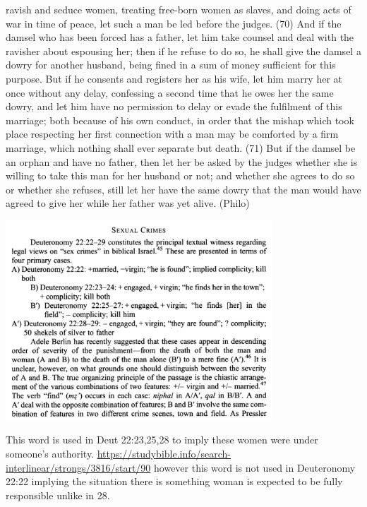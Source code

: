 \documentclass[11pt]{article}
\begin{document}
{ravish and seduce women, treating free-born women as slaves, and doing acts of war in time of peace, let such a man be led before the judges. (70) And if the damsel who has been forced has a father, let him take counsel and deal with the ravisher about espousing her; then if he refuse to do so, he shall give the damsel a dowry for another husband, being fined in a sum of money sufficient for this purpose. But if he consents and registers her as his wife, let him marry her at once without any delay, confessing a second time that he owes her the same dowry, and let him have no permission to delay or evade the fulfilment of this marriage; both because of his own conduct, in order that the mishap which took place respecting her first connection with a man may be comforted by a firm marriage, which nothing shall ever separate but death. (71) But if the damsel be an orphan and have no father, then let her be asked by the judges whether she is willing to take this man for her husband or not; and whether she agrees to do so or whether she refuses, still let her have the same dowry that the man would have agreed to give her while her father was yet alive.
(Philo)

\includegraphics[width=10cm]{deuteronomy22_case_options}

This word is used in Deut 22:23,25,28 to imply these women were under someone’s authority. \url{https://studybible.info/search-interlinear/strongs/3816/start/90} however this word is not used in Deuteronomy 22:22 implying the situation there is something woman is expected to be fully responsible unlike in 28.



}
\end{document}
